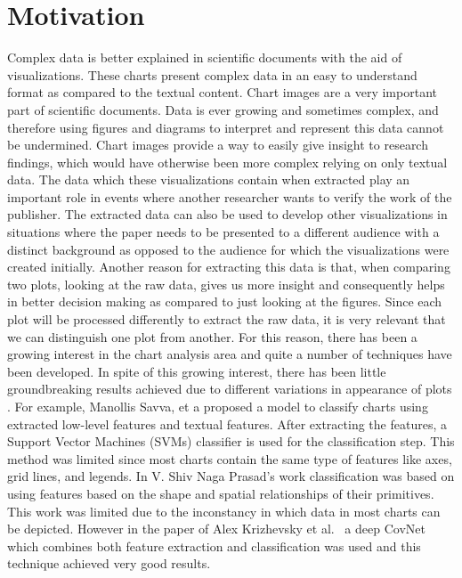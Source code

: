 \documentclass[12pt, a4paper,oneside]{report}
\begin{document}
\section{Motivation}
Complex data is better explained in scientific documents with the aid of visualizations. These charts present complex data in an easy to understand format as compared to the textual content. 
Chart images are a very important part of scientific documents.
Data is ever growing and sometimes complex, and therefore using figures and diagrams to interpret and represent this data cannot be undermined. Chart images provide a way to easily give insight to  research findings, which would have otherwise been more complex relying on only textual data. The data which these visualizations contain when extracted play an important role in events where another researcher wants to verify the work of the publisher. The extracted data can also be used to develop other visualizations in situations where the paper needs to be presented to a different audience with a distinct background as opposed to the audience for which the visualizations were created initially. Another reason for extracting this data is that, when comparing two plots, looking at the raw data, gives us more insight and consequently helps in better decision making as compared to just looking at the figures. Since each plot will be processed differently to extract the raw data, it is very relevant that we can distinguish one plot from another. For this reason, there has been a growing interest in the chart analysis area and quite a number of techniques have been developed. In spite of this growing interest, there has been little groundbreaking results achieved due to different variations in appearance of plots \cite{liu2015chart}. For example, Manollis Savva, et a \cite{savva2011revision} proposed a model to classify charts using extracted low-level features and textual features. After extracting the features, a  Support Vector Machines (SVMs) classifier is used for the classification step. This method was limited since most charts contain the same type of features like axes, grid lines, and legends. In V. Shiv Naga Prasad's work \cite{prasad2007classifying} classification was based on using features based on the shape and spatial relationships of their primitives. This work was limited due to the inconstancy in which data in most charts can be depicted. However in the paper of Alex Krizhevsky et al.~\cite{krizhevsky2012imagenet} a deep CovNet which combines both feature extraction and classification was used and this technique achieved very good results.
\end{document}
